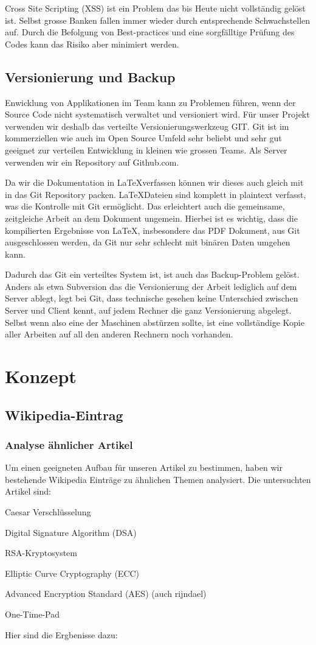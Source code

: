 \documentclass[11pt,paper=a4,final]{scrartcl}
\begin{document}
Cross Site Scripting (XSS) ist ein Problem das bis Heute nicht vollst\"andig
gel\"ost ist. Selbst grosse Banken fallen immer wieder durch entsprechende
Schwachstellen auf.\cite{heise:banken-xss} Durch die Befolgung von Best-practices und
eine sorgf\"alltige Pr\"ufung des Codes kann das Risiko aber minimiert werden.
\subsection{Versionierung und Backup}
Enwicklung von Applikationen im Team kann zu Problemen f\"uhren, wenn der Source
Code nicht systematisch verwaltet und versioniert wird. F\"ur unser Projekt
verwenden wir deshalb das verteilte Versionierungswerkzeug GIT. Git ist im
kommerziellen wie auch im Open Source Umfeld sehr beliebt und sehr gut geeignet
zur verteilen Entwicklung in kleinen wie grossen Teams. Als Server verwenden wir
ein Repository auf Github.com.

Da wir die Dokumentation in \LaTeX verfassen k\"onnen wir dieses auch gleich mit
in das Git Repository packen. \LaTeX Dateien sind komplett in plaintext
verfasst, was die Kontrolle mit Git erm\"oglicht. Das erleichtert auch die
gemeinsame, zeitgleiche Arbeit an dem Dokument ungemein. Hierbei ist es wichtig,
dass die kompilierten Ergebnisse von \LaTeX, insbesondere das PDF Dokument, aus
Git ausgeschlossen werden, da Git nur sehr schlecht mit bin\"aren Daten umgehen
kann.

Dadurch das Git ein verteiltes System ist, ist auch das Backup-Problem gel\"ost.
Anders als etwa Subversion das die Versionierung der Arbeit lediglich auf dem
Server ablegt, legt bei Git, dass technische gesehen keine Unterschied zwischen
Server und Client kennt, auf jedem Rechner die ganz Versionierung abgelegt.
Selbst wenn also eine der Maschinen abst\"urzen sollte, ist eine vollst\"andige
Kopie aller Arbeiten auf all den anderen Rechnern noch vorhanden.

\section{Konzept}
\subsection{Wikipedia-Eintrag}
\subsubsection{Analyse \"ahnlicher Artikel}
Um einen geeigneten Aufbau f\"ur unseren Artikel zu bestimmen, haben wir
bestehende Wikipedia Eintr\"age zu \"ahnlichen Themen analysiert. Die
untersuchten Artikel sind:
\begin{itemize*}
  \item Caesar Verschl\"usselung
  \item Digital Signature Algorithm (DSA)
  \item RSA-Kryptosystem 
  \item Elliptic Curve Cryptography (ECC)
  \item Advanced Encryption Standard (AES) (auch rijndael)
  \item One-Time-Pad
\end{itemize*}
Hier sind die Ergbenisse dazu:
\end{document}
